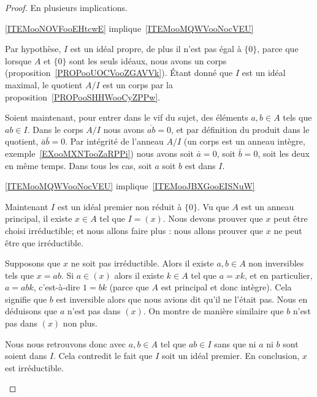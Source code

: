 \begin{proof}
    En plusieurs implications.
    \begin{subproof}
        \item[\ref{ITEMooNOVFooEHtcwE} implique~\ref{ITEMooMQWVooNocVEU}]

            Par hypothèse, \( I\) est un idéal propre, de plus il n'est pas égal à \( \{ 0 \}\), parce que lorsque \( A\) et \( \{ 0 \} \) sont les seuls idéaux, nous avons un corps (proposition~\ref{PROPooUOCVooZGAVVk}). Étant donné que \( I\) est un idéal maximal, le quotient \( A/I\) est un corps par la proposition~\ref{PROPooSHHWooCyZPPw}.

            Soient maintenant, pour entrer dans le vif du sujet, des éléments \( a,b\in A\) tels que \( ab\in I\). Dans le corps \( A/I\) nous avons \( \overline{ ab }=0\), et par définition du produit dans le quotient, \( \bar a\bar b=0\). Par intégrité de l'anneau \( A/I\) (un corps est un anneau intègre, exemple~\ref{EXooMXNTooZaRPPi}) nous avons soit \( \bar a=0\), soit \( \bar b=0\), soit les deux en même temps. Dans tous les cas, soit \( a\) soit \( b\) est dans \( I\).

        \item[\ref{ITEMooMQWVooNocVEU} implique~\ref{ITEMooJBXGooEISNuW}]

            Maintenant \( I\) est un idéal premier non réduit à \( \{ 0 \}\). Vu que \( A\) est un anneau principal, il existe \( x\in A\) tel que \( I=(x)\). Nous devons prouver que \( x\) peut être choisi irréductible; et nous allons faire plus : nous allons prouver que \( x\) ne peut être que irréductible.

            Supposons que \( x\) ne soit pas irréductible. Alors il existe \( a,b\in A\) non inversibles tels que \( x=ab\). Si \( a\in (x)\) alors il existe \( k\in A\) tel que \( a=xk\), et en particulier, \( a=abk\), c'est-à-dire \( 1=bk\) (parce que \( A\) est principal et donc intègre). Cela signifie que \( b\) est inversible alors que nous avions dit qu'il ne l'était pas. Nous en déduisons que \( a\) n'est pas dans \( (x)\). On montre de manière similaire que \( b\) n'est pas dans \( (x)\) non plus.

            Nous nous retrouvons donc avec \( a,b\in A\) tel que \( ab\in I\) sans que ni \( a\) ni \( b\) sont soient dans \( I\). Cela contredit le fait que \( I\) soit un idéal premier. En conclusion, \( x\) est irréductible.


\end{subproof}
\end{proof}
